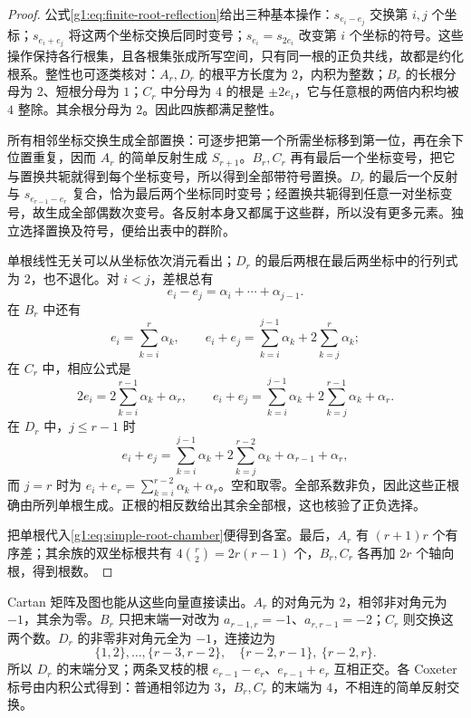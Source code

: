 \begin{proof}
	公式\eqref{g1:eq:finite-root-reflection}给出三种基本操作：\(s_{e_i-e_j}\) 交换第 \(i,j\) 个坐标；\(s_{e_i+e_j}\) 将这两个坐标交换后同时变号；\(s_{e_i}=s_{2e_i}\) 改变第 \(i\) 个坐标的符号。这些操作保持各行根集，且各根集张成所写空间，只有同一根的正负共线，故都是约化根系。整性也可逐类核对：\(A_r,D_r\) 的根平方长度为 \(2\)，内积为整数；\(B_r\) 的长根分母为 \(2\)、短根分母为 \(1\)；\(C_r\) 中分母为 \(4\) 的根是 \(\pm2e_i\)，它与任意根的两倍内积均被 \(4\) 整除。其余根分母为 \(2\)。因此四族都满足整性。

	所有相邻坐标交换生成全部置换：可逐步把第一个所需坐标移到第一位，再在余下位置重复，因而 \(A_r\) 的简单反射生成 \(S_{r+1}\)。\(B_r,C_r\) 再有最后一个坐标变号，把它与置换共轭就得到每个坐标变号，所以得到全部带符号置换。\(D_r\) 的最后一个反射与 \(s_{e_{r-1}-e_r}\) 复合，恰为最后两个坐标同时变号；经置换共轭得到任意一对坐标变号，故生成全部偶数次变号。各反射本身又都属于这些群，所以没有更多元素。独立选择置换及符号，便给出表中的群阶。

	单根线性无关可以从坐标依次消元看出；\(D_r\) 的最后两根在最后两坐标中的行列式为 \(2\)，也不退化。对 \(i<j\)，差根总有
	\[
		e_i-e_j=\alpha_i+\cdots+\alpha_{j-1}.
	\]
	在 \(B_r\) 中还有
	\[
		e_i=\sum_{k=i}^r\alpha_k,\qquad
		e_i+e_j=\sum_{k=i}^{j-1}\alpha_k+2\sum_{k=j}^r\alpha_k;
	\]
	在 \(C_r\) 中，相应公式是
	\[
		2e_i=2\sum_{k=i}^{r-1}\alpha_k+\alpha_r,\qquad
		e_i+e_j=\sum_{k=i}^{j-1}\alpha_k+2\sum_{k=j}^{r-1}\alpha_k+\alpha_r.
	\]
	在 \(D_r\) 中，\(j\le r-1\) 时
	\[
		e_i+e_j=\sum_{k=i}^{j-1}\alpha_k+2\sum_{k=j}^{r-2}\alpha_k+\alpha_{r-1}+\alpha_r,
	\]
	而 \(j=r\) 时为 \(e_i+e_r=\sum_{k=i}^{r-2}\alpha_k+\alpha_r\)。空和取零。全部系数非负，因此这些正根确由所列单根生成。正根的相反数给出其余全部根，这也核验了正负选择。

	把单根代入\eqref{g1:eq:simple-root-chamber}便得到各室。最后，\(A_r\) 有 \((r+1)r\) 个有序差；其余族的双坐标根共有 \(4\binom r2=2r(r-1)\) 个，\(B_r,C_r\) 各再加 \(2r\) 个轴向根，得到根数。
\end{proof}

Cartan 矩阵及图也能从这些向量直接读出。\(A_r\) 的对角元为 \(2\)，相邻非对角元为 \(-1\)，其余为零。\(B_r\) 只把末端一对改为 \(a_{r-1,r}=-1\)、\(a_{r,r-1}=-2\)；\(C_r\) 则交换这两个数。\(D_r\) 的非零非对角元全为 \(-1\)，连接边为
\[
	\{1,2\},\ldots,\{r-3,r-2\},\quad
	\{r-2,r-1\},\ \{r-2,r\}.
\]
所以 \(D_r\) 的末端分叉；两条叉枝的根 \(e_{r-1}-e_r\)、\(e_{r-1}+e_r\) 互相正交。各 Coxeter 标号由内积公式得到：普通相邻边为 \(3\)，\(B_r,C_r\) 的末端为 \(4\)，不相连的简单反射交换。

